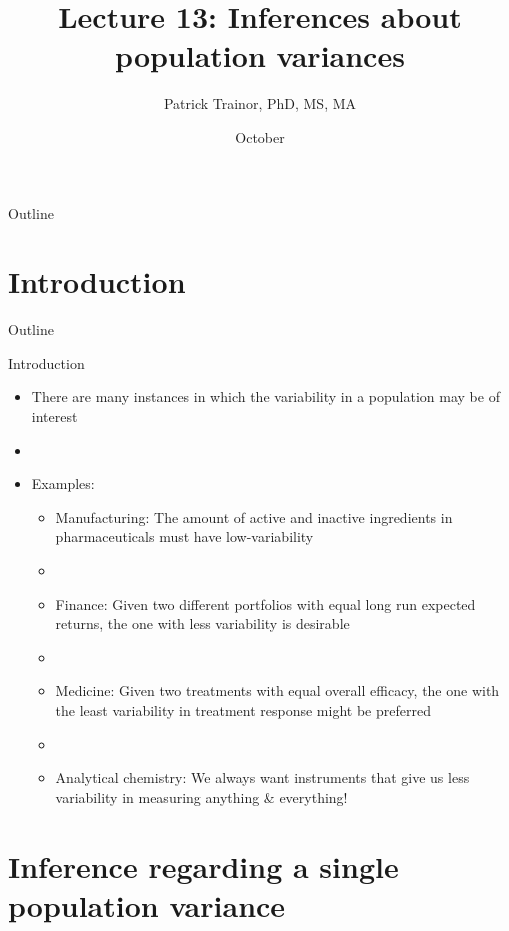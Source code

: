 \documentclass[xcolor=dvipsnames]{beamer}
\title[Lecture 13]{Lecture 13: Inferences about population variances}
\author[Patrick Trainor]{Patrick Trainor, PhD, MS, MA}
\institute[NMSU]{New Mexico State University}
\date{October}
\begin{document}
	
\begin{frame}
	\maketitle
\end{frame}

\begin{frame}{Outline}
	\tableofcontents[hideallsubsections]
\end{frame}

\section{Introduction}

\begin{frame}{Outline}
	\tableofcontents[currentsection,subsectionstyle=show/shaded/hide]
\end{frame}

\begin{frame}{Introduction}
	\begin{itemize}
		\item There are many instances in which the variability in a population may be of interest
		\item[]
		\item Examples:
		\begin{itemize}
			\item Manufacturing: The amount of active and inactive ingredients in pharmaceuticals must have low-variability
			\item[]
			\item Finance: Given two different portfolios with equal long run expected returns, the one with less variability is desirable
			\item[]
			\item Medicine: Given two treatments with equal overall efficacy, the one with the least variability in treatment response might be preferred
			\item[]
			\item Analytical chemistry: We always want instruments that give us less variability in measuring anything \& everything!
		\end{itemize}
	\end{itemize}
\end{frame}

\section{Inference regarding a single population variance}
\end{document}
